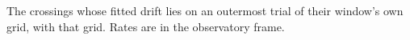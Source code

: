 \begin{table}
\caption{The crossings whose fitted drift lies on an outermost trial of
their window's own grid, with that grid. Rates are in the observatory
frame.}
\label{tab:edge}
\footnotesize

\end{table}

